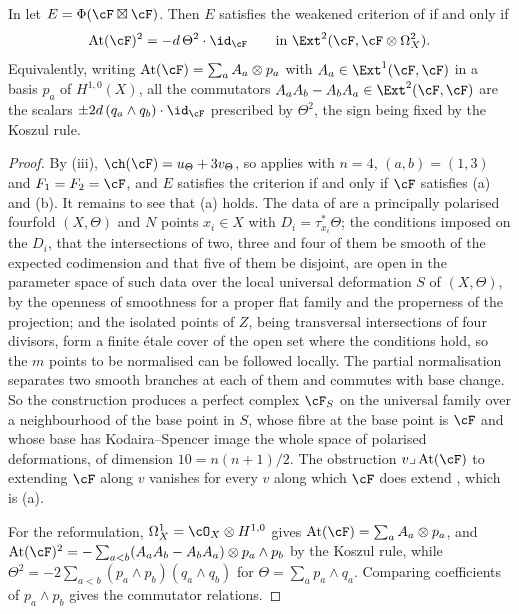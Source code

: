 \begin{corollary}\label{cor:markmancondition}
In  let $E=\Phi(\cF\boxtimes\cF)$. Then $E$ satisfies the
weakened criterion of \cite[Question 11.4]{Mar25b} if and only if
\begin{equation}\label{eq:heisenberg}
  \mathrm{At}(\cF)^{2}=-d\,\Theta^{2}\cdot\id_{\cF}
  \qquad\text{in }\Ext^{2}(\cF,\cF\otimes\Omega^{2}_{X}).
\end{equation}
Equivalently, writing $\mathrm{At}(\cF)=\sum_{a}A_{a}\otimes p_{a}$ with
$A_{a}\in\Ext^{1}(\cF,\cF)$ in a basis $p_{a}$ of $H^{1,0}(X)$, all the
commutators $A_{a}A_{b}-A_{b}A_{a}\in\Ext^{2}(\cF,\cF)$ are the scalars
$\pm2d\,(q_{a}\wedge q_{b})\cdot\id_{\cF}$ prescribed by $\Theta^{2}$, the
sign being fixed by the Koszul rule.
\end{corollary}

\begin{proof}
By (iii), $\ch(\cF)=u_{\Theta}+3v_{\Theta}$, so
 applies with $n=4$, $(a,b)=(1,3)$ and $F_{1}=F_{2}=\cF$, and
$E$ satisfies the criterion if and only if $\cF$ satisfies (a) and (b). It
remains to see that (a) holds. The data of  are a
principally polarised fourfold $(X,\Theta)$ and $N$ points $x_{i}\in X$ with
$D_{i}=\tau_{x_{i}}^{*}\Theta$; the conditions imposed on the $D_{i}$, that
the intersections of two, three and four of them be smooth of the expected
codimension and that five of them be disjoint, are open in the parameter
space of such data over the local universal deformation $S$ of $(X,\Theta)$,
by the openness of smoothness for a proper flat family and the properness of
the projection; and the isolated points of $Z$, being transversal
intersections of four divisors, form a finite \'etale cover of the open set
where the conditions hold, so the $m$ points to be normalised can be followed
locally. The partial normalisation separates two smooth branches at each of
them and commutes with base change. So the construction produces a perfect
complex $\cF_{S}$ on the universal family over a neighbourhood of the base
point in $S$, whose fibre at the base point is $\cF$ and whose base has
Kodaira--Spencer image the whole space of polarised deformations, of
dimension $10=n(n+1)/2$. The obstruction $v\lrcorner\,\mathrm{At}(\cF)$ to
extending $\cF$ along $v$ vanishes for every $v$ along which $\cF$ does extend
\cite{Tod09}, which is (a).

For the reformulation, $\Omega^{1}_{X}=\cO_{X}\otimes H^{1,0}$ gives
$\mathrm{At}(\cF)=\sum_{a}A_{a}\otimes p_{a}$, and
$\mathrm{At}(\cF)^{2}=-\sum_{a<b}(A_{a}A_{b}-A_{b}A_{a})\otimes p_{a}\wedge p_{b}$
by the Koszul rule, while $\Theta^{2}=-2\sum_{a<b}(p_{a}\wedge p_{b})(q_{a}\wedge q_{b})$
for $\Theta=\sum_{a}p_{a}\wedge q_{a}$. Comparing coefficients of
$p_{a}\wedge p_{b}$ gives the commutator relations.
\end{proof}

